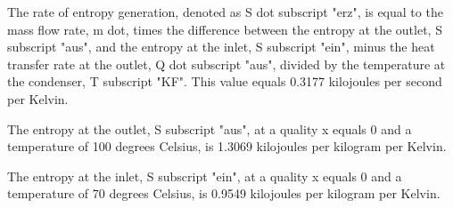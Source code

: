 The rate of entropy generation, denoted as S dot subscript "erz", is equal to the mass flow rate, m dot, times the difference between the entropy at the outlet, S subscript "aus", and the entropy at the inlet, S subscript "ein", minus the heat transfer rate at the outlet, Q dot subscript "aus", divided by the temperature at the condenser, T subscript "KF". This value equals 0.3177 kilojoules per second per Kelvin.

The entropy at the outlet, S subscript "aus", at a quality x equals 0 and a temperature of 100 degrees Celsius, is 1.3069 kilojoules per kilogram per Kelvin.

The entropy at the inlet, S subscript "ein", at a quality x equals 0 and a temperature of 70 degrees Celsius, is 0.9549 kilojoules per kilogram per Kelvin.